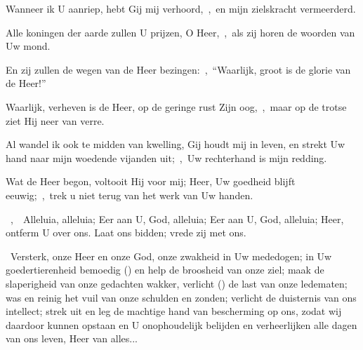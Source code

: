 \documentclass[12pt,twoside,a5paper]{article}
\begin{document}
\begin{halfparskip}
  Wanneer ik U aanriep, hebt Gij mij verhoord,~\sep\ en mijn zielskracht vermeerderd.

  Alle koningen der aarde zullen U prijzen, O Heer,~\sep\ als zij horen de woorden van Uw mond.

  En zij zullen de wegen van de Heer bezingen:~\sep\ ``Waarlijk, groot is de glorie van de Heer!''

  Waarlijk, verheven is de Heer, op de geringe rust Zijn oog,~\sep\ maar op de trotse ziet Hij neer van verre.

  Al wandel ik ook te midden van kwelling, Gij houdt mij in leven, en strekt Uw hand naar mijn woedende vijanden uit;~\sep\ Uw rechterhand is mijn redding.

  Wat de Heer begon, voltooit Hij voor mij; Heer, Uw goedheid blijft eeuwig;~\sep\ trek u niet terug van het werk van Uw handen.
\end{halfparskip}

\begin{halfparskip}
  ~\sep\ \dd~Alleluia, alleluia; Eer aan U, God, alleluia; Eer aan U, God, alleluia; Heer, ontferm U over ons. Laat ons bidden; vrede zij met ons.

  \cc~Versterk, onze Heer en onze God, onze zwakheid in Uw mededogen; in Uw goedertierenheid bemoedig
  () en help de broosheid van onze ziel; maak de slaperigheid van onze gedachten wakker, verlicht () de last van onze ledematen; was en reinig het vuil van onze schulden en zonden; verlicht de duisternis van ons intellect; strek uit en leg de machtige hand van bescherming op ons, zodat wij daardoor kunnen opstaan en U onophoudelijk belijden en verheerlijken alle dagen van ons leven, Heer van alles...
\end{halfparskip}


\end{document}

